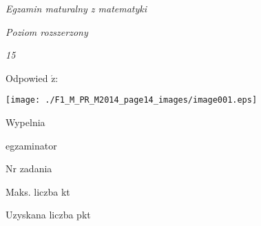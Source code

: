 \documentclass[a4paper,12pt]{article}
\begin{document}
{\it Egzamin maturalny z matematyki}

{\it Poziom rozszerzony}

{\it 15}

Odpowied $\acute{\mathrm{z}}$:
\begin{center}
\texttt{[image: ./F1\_M\_PR\_M2014\_page14\_images/image001.eps]}
\end{center}
Wypelnia

egzaminator

Nr zadania

Maks. liczba kt

Uzyskana liczba pkt
\end{document}
